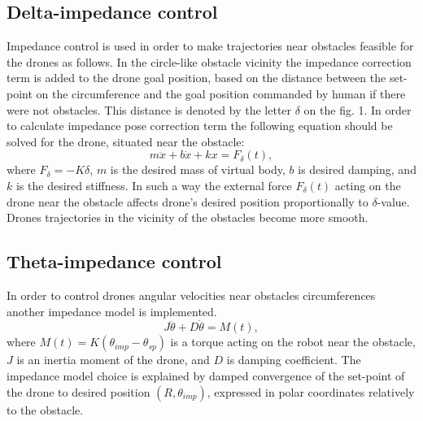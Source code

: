 \documentclass[letterpaper, 10 pt, conference]{ieeeconf}  %
\begin{document}
\subsection{Delta-impedance control}

Impedance control is used in order to make trajectories near obstacles feasible for the drones as follows. In the circle-like obstacle vicinity the impedance correction term is added to the drone goal position, based on the distance between the set-point on the circumference and the goal position commanded by human if there were not obstacles. This distance is denoted by the letter $\delta$ on the fig. 1. In order to calculate impedance pose correction term the following equation should be solved for the drone, situated near the obstacle:
$$m\ddot{x} + b\dot{x} + k x = F_\delta (t),$$
where $F_\delta=-K\delta$, $m$ is the desired mass of virtual body, $b$ is desired damping, and $k$ is the desired stiffness. In such a way the external force $F_\delta(t)$ acting on the drone near the obstacle affects drone's desired position proportionally to $\delta$-value.
Drones trajectories in the vicinity of the obstacles become more smooth.

\subsection{Theta-impedance control}
In order to control drones angular velocities near obstacles circumferences another impedance model is implemented.
$$J\ddot{\theta} + D\dot{\theta} = M(t),$$
where $M(t) = K (\theta_{imp} - \theta_{sp})$ is a torque acting on the robot near the obstacle, $J$ is an inertia moment of the drone, and $D$ is damping coefficient. The impedance model choice is explained by damped convergence of the set-point of the drone to desired position $(R, \theta_{imp})$, expressed in polar coordinates relatively to the obstacle. 

\addtolength{\textheight}{-12cm}   %

\end{document}
